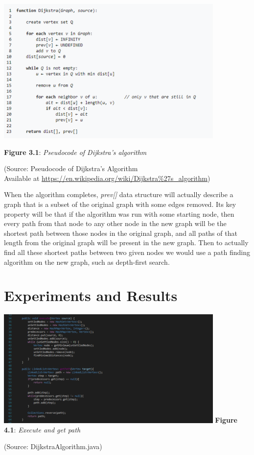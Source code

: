 \documentclass{article}
\begin{document}
\includegraphics[width=320pt]{image/Pseudocode.png}
\begin{center}
    \textbf{Figure 3.1}: \textit{Pseudocode of Dijkstra’s algorithm}
\end{center}
\begin{flushright}
    (Source: Pseudocode of Dijkstra’s Algorithm\\
    Available at \url{https://en.wikipedia.org/wiki/Dijkstra%27s_algorithm}) 
\end{flushright}

When the algorithm completes, \textit{prev[]} data structure will actually describe a graph that is a subset of the original graph with some edges removed. Its key property will be that if the algorithm was run with some starting node, then every path from that node to any other node in the new graph will be the shortest path between those nodes in the original graph, and all paths of that length from the original graph will be present in the new graph. Then to actually find all these shortest paths between two given nodes we would use a path finding algorithm on the new graph, such as depth-first search.

\section{Experiments and Results}

\begin{center}
    \includegraphics[width=320pt]{image/1.png}
    \textbf{Figure 4.1}: \textit{Execute and get path}
    \begin{flushright}
        (Source: DijkstraAlgorithm.java) 
    \end{flushright}
\end{center}
\end{document}
